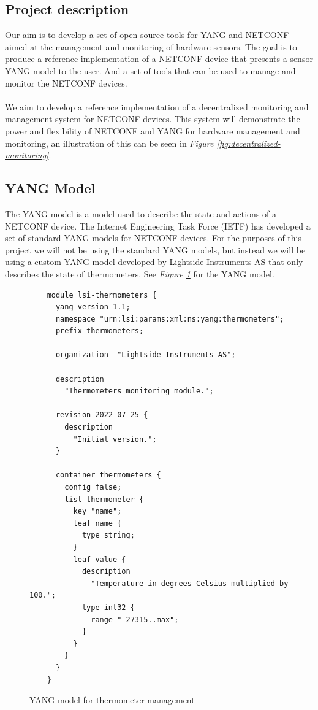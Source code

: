 \documentclass[12pt]{article}
\begin{document}
\subsection{Project description}
Our aim is to develop a set of open source tools for YANG and NETCONF aimed at the management and monitoring of hardware sensors.
The goal is to produce a reference implementation of a NETCONF device that presents a sensor YANG model to the user.
And a set of tools that can be used to manage and monitor the NETCONF devices. 
\\
\\
We aim to develop a reference implementation of a decentralized monitoring and management system for NETCONF devices.
This system will demonstrate the power and flexibility of NETCONF and YANG for hardware management and monitoring, an 
illustration of this can be seen in \textit{Figure \ref{fig:decentralized-monitoring}}.

\subsection{YANG Model}
The YANG model is a model used to describe the state and actions of a NETCONF device.
The Internet Engineering Task Force (IETF) has developed a set of standard YANG models for NETCONF devices.
For the purposes of this project we will not be using the standard YANG models,
but instead we will be using a custom YANG model developed by Lightside Instruments AS that only 
describes the state of thermometers. See \textit{Figure \ref{fig:yang}} for the YANG model.
\begin{figure}
  \begin{verbatim}
    module lsi-thermometers {
      yang-version 1.1;
      namespace "urn:lsi:params:xml:ns:yang:thermometers";
      prefix thermometers;

      organization  "Lightside Instruments AS";

      description
        "Thermometers monitoring module.";

      revision 2022-07-25 {
        description
          "Initial version.";
      }

      container thermometers {
        config false;
        list thermometer {
          key "name";
          leaf name {
            type string;
          }
          leaf value {
            description
              "Temperature in degrees Celsius multiplied by 100.";
            type int32 {
              range "-27315..max";
            }
          }
        }
      }
    }
  \end{verbatim}
  \caption{YANG model for thermometer management}
  \label{fig:yang}
\end{figure}
\end{document}
